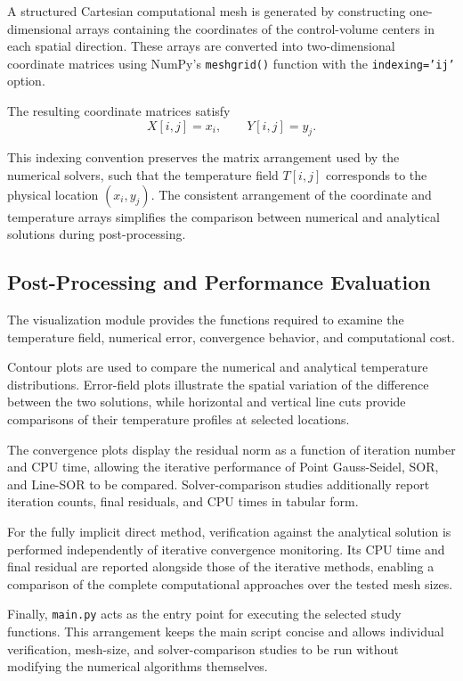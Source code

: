 A structured Cartesian computational mesh is generated by constructing one-dimensional arrays containing the coordinates of the control-volume centers in each spatial direction. These arrays are converted into two-dimensional coordinate matrices using NumPy's \texttt{meshgrid()} function with the \texttt{indexing='ij'} option.

The resulting coordinate matrices satisfy
\[
X[i,j]=x_i,
\qquad
Y[i,j]=y_j.
\]

This indexing convention preserves the matrix arrangement used by the numerical solvers, such that the temperature field $T[i,j]$ corresponds to the physical location $(x_i,y_j)$. The consistent arrangement of the coordinate and temperature arrays simplifies the comparison between numerical and analytical solutions during post-processing.


\subsection{Post-Processing and Performance Evaluation}

The visualization module provides the functions required to examine the temperature field, numerical error, convergence behavior, and computational cost.

Contour plots are used to compare the numerical and analytical temperature distributions. Error-field plots illustrate the spatial variation of the difference between the two solutions, while horizontal and vertical line cuts provide comparisons of their temperature profiles at selected locations.

The convergence plots display the residual norm as a function of iteration number and CPU time, allowing the iterative performance of Point Gauss-Seidel, SOR, and Line-SOR to be compared. Solver-comparison studies additionally report iteration counts, final residuals, and CPU times in tabular form.

For the fully implicit direct method, verification against the analytical solution is performed independently of iterative convergence monitoring. Its CPU time and final residual are reported alongside those of the iterative methods, enabling a comparison of the complete computational approaches over the tested mesh sizes.

Finally, \texttt{main.py} acts as the entry point for executing the selected study functions. This arrangement keeps the main script concise and allows individual verification, mesh-size, and solver-comparison studies to be run without modifying the numerical algorithms themselves.
